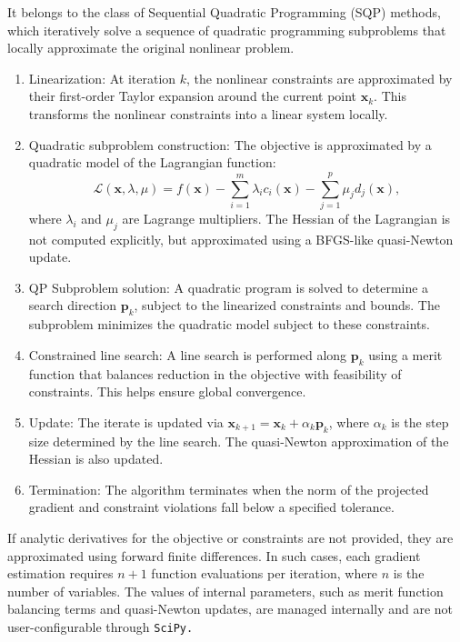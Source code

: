 It belongs to the class of Sequential Quadratic Programming (SQP) methods, which iteratively solve a sequence of quadratic programming subproblems that locally approximate the original nonlinear problem. 
\begin{enumerate}
    \item Linearization: At iteration $k$, the nonlinear constraints are approximated by their first-order Taylor expansion around the current point $\mathbf{x}_k$.
    This transforms the nonlinear constraints into a linear system locally.
    \item Quadratic subproblem construction: The objective is approximated by a quadratic model of the Lagrangian function: \begin{equation}
        \mathcal{L}(\mathbf{x}, \lambda, \mu) = f(\mathbf{x}) - \sum_{i=1}^{m} \lambda_i c_i(\mathbf{x}) - \sum_{j=1}^{p} \mu_j d_j(\mathbf{x}),
    \end{equation}
    where $\lambda_i$ and $\mu_j$ are Lagrange multipliers. 
    The Hessian of the Lagrangian is not computed explicitly, but approximated using a BFGS-like quasi-Newton update.
    \item QP Subproblem solution: A quadratic program is solved to determine a search direction $\mathbf{p}_k$, subject to the linearized constraints and bounds. 
    The subproblem minimizes the quadratic model subject to these constraints.
    \item Constrained line search: A line search is performed along $\mathbf{p}_k$ using a merit function that balances reduction in the objective with feasibility of constraints. 
    This helps ensure global convergence.
    \item Update: The iterate is updated via $\mathbf{x}_{k+1} = \mathbf{x}_k + \alpha_k \mathbf{p}_k$, where $\alpha_k$ is the step size determined by the line search. 
    The quasi-Newton approximation of the Hessian is also updated.
    \item Termination: The algorithm terminates when the norm of the projected gradient and constraint violations fall below a specified tolerance.
\end{enumerate}

If analytic derivatives for the objective or constraints are not provided, they are approximated using forward finite differences. 
In such cases, each gradient estimation requires $n+1$ function evaluations per iteration, where $n$ is the number of variables.
The values of internal parameters, such as merit function balancing terms and quasi-Newton updates, are managed internally and are not user-configurable through \tt{SciPy}.

